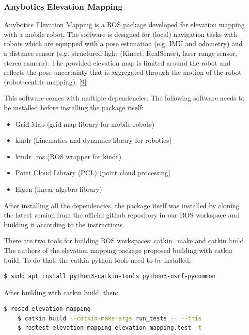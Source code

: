 \documentclass{article}
\begin{document}
\subsubsection{Anybotics Elevation Mapping}

Anybotics Elevation Mapping is a ROS package developed for elevation mapping with a mobile robot. The software is designed for (local) navigation tasks with robots which are equipped with a pose estimation (e.g. IMU and odometry) and a distance sensor (e.g. structured light (Kinect, RealSense), laser range sensor, stereo camera). The provided elevation map is limited around the robot and reflects the pose uncertainty that is aggregated through the motion of the robot (robot-centric mapping). \href{https://github.com/ANYbotics/elevation_mapping}{[9]}

This software comes with multiple dependencies. The following software needs to be installed before installing the package itself:

\begin{itemize}
    \item Grid Map (grid map library for mobile robots)
    \item kindr (kinematics and dynamics library for robotics)
    \item kindr\_ros (ROS wrapper for kindr)
    \item Point Cloud Library (PCL) (point cloud processing)
    \item Eigen (linear algebra library)
\end{itemize}

After installing all the dependencies, the package itself was installed by cloning the latest version from the official github repository in our ROS workspace and building it according to the instructions. 

There are two tools for building ROS workspaces: catkin\_make and catkin build. The authors of the elevation mapping package proposed building with catkin build. To do that, the catkin python tools need to be installed:

\begin{lstlisting}[language=bash]
    $ sudo apt install python3-catkin-tools python3-osrf-pycommon
\end{lstlisting}

After building with catkin build, then:

\begin{lstlisting}[language=bash]
    $ roscd elevation_mapping
    $ catkin build --catkin-make-args run_tests -- --this
    $ rostest elevation_mapping elevation_mapping.test -t
\end{lstlisting}
\end{document}
